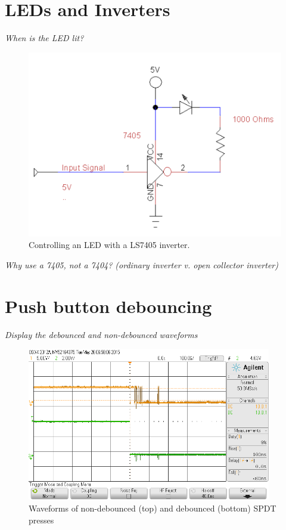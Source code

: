 \documentclass[11pt]{article}
\begin{document}
\section{LEDs and Inverters}
{\em When is the LED lit?}
\begin{figure}[h]
	\centering
	\includegraphics[scale=0.6, draft=false]{inverter}
	\caption{Controlling an LED with a LS7405 inverter.}
	\label{fig:inverter}
\end{figure}

{\em Why use a 7405, not a 7404? (ordinary inverter v. open collector inverter)}

\section{Push button debouncing}
{\em Display the debounced and non-debounced waveforms}
\begin{figure}[h]
	\centering
	\includegraphics[width=0.95\textwidth, draft=false]{debounce}
	\caption{Waveforms of non-debounced (top) and debounced (bottom) SPDT presses}
	\label{fig:debounce}
\end{figure}
\end{document}
